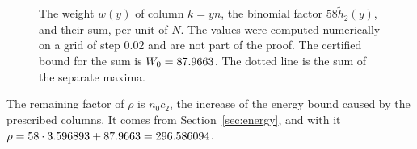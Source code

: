 \begin{figure}[ht]
\centering

\caption{The weight $w(y)$ of column $k=yn$, the binomial factor $58\tilde h_2(y)$, and their sum, per unit
of $N$. The values were computed numerically on a grid of step $0.02$ and are not part of the proof. The
certified bound for the sum is $W_0=87.9663$. The dotted line is the sum of the separate maxima.}
\label{fig:columns}
\end{figure}

The remaining factor of $\rho$ is $n_0c_2$, the increase of the energy bound caused by the prescribed
columns. It comes from Section~\ref{sec:energy}, and with it $\rho=58\cdot3.596893+87.9663=296.586094$.
